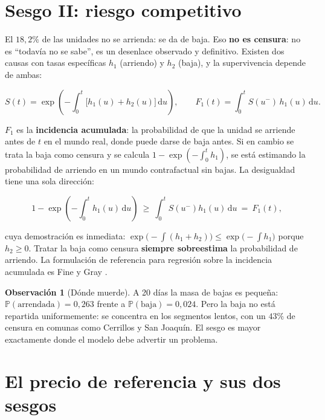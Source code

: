 \documentclass[11pt,a4paper]{article}
\theoremstyle{definition}
\newtheorem{observacion}{Observación}
\newcommand{\Prob}{\mathbb{P}}
\newcommand{\dd}{\,\mathrm{d}}
\begin{document}
\section{Sesgo II: riesgo competitivo}

El $18{,}2\%$ de las unidades no se arrienda: se da de baja. Eso \textbf{no es
censura}: no es ``todavía no se sabe'', es un desenlace observado y definitivo.
Existen dos causas con tasas específicas $h_1$ (arriendo) y $h_2$ (baja), y la
supervivencia depende de ambas:

\begin{equation}
S(t)=\exp\!\left(-\int_0^t\bigl[h_1(u)+h_2(u)\bigr]\dd u\right),
\qquad
F_1(t)=\int_0^t S(u^-)\,h_1(u)\dd u.
\label{eq:cif}
\end{equation}

$F_1$ es la \textbf{incidencia acumulada}: la probabilidad de que la unidad se
arriende antes de $t$ en el mundo real, donde puede darse de baja antes. Si en
cambio se trata la baja como censura y se calcula
$1-\exp(-\int_0^t h_1)$, se está estimando la probabilidad de arriendo en un
mundo contrafactual sin bajas. La desigualdad tiene una sola dirección:

\begin{equation}
1-\exp\!\left(-\int_0^t h_1(u)\dd u\right)
\ \ge\
\int_0^t S(u^-)h_1(u)\dd u
\ =\ F_1(t),
\label{eq:desigualdad}
\end{equation}

cuya demostración es inmediata: $\exp\bigl(-\int(h_1+h_2)\bigr)\le
\exp\bigl(-\int h_1\bigr)$ porque $h_2\ge 0$. Tratar la baja como censura
\textbf{siempre sobreestima} la probabilidad de arriendo. La formulación de
referencia para regresión sobre la incidencia acumulada es Fine y Gray
\cite{finegray1999}.

\begin{observacion}[Dónde muerde]
A 20 días la masa de bajas es pequeña: $\Prob(\text{arrendada})=0{,}263$ frente a
$\Prob(\text{baja})=0{,}024$. Pero la baja no está repartida uniformemente: se
concentra en los segmentos lentos, con un $43\%$ de censura en comunas como
Cerrillos y San Joaquín. El sesgo es mayor exactamente donde el modelo debe
advertir un problema.
\end{observacion}

\section{El precio de referencia y sus dos sesgos}
\end{document}
